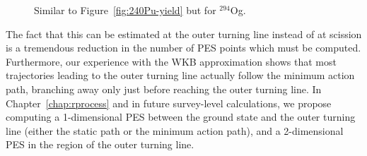 \begin{figure}%
	\centering
	\qquad
	\caption{Similar to Figure~\ref{fig:240Pu-yield} but for $^{294}$Og.}%
	\label{fig:294Og-frags}%
\end{figure}


The fact that this can be estimated at the outer turning line instead of at scission is a tremendous reduction in the number of PES points which must be computed. Furthermore, our experience with the WKB approximation shows that most trajectories leading to the outer turning line actually follow the minimum action path, branching away only just before reaching the outer turning line. In Chapter~\ref{chap:rprocess} and in future survey-level calculations, we propose computing a 1-dimensional PES between the ground state and the outer turning line (either the static path or the minimum action path), and a 2-dimensional PES in the region of the outer turning line.


